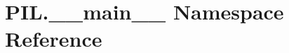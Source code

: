 \hypertarget{namespacePIL_1_1____main____}{}\section{P\+I\+L.\+\_\+\+\_\+main\+\_\+\+\_\+ Namespace Reference}
\label{namespacePIL_1_1____main____}
